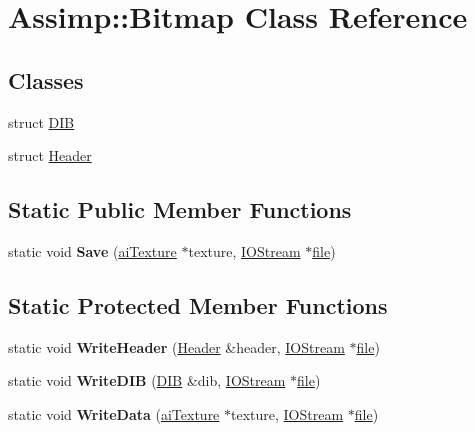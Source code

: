 \hypertarget{class_assimp_1_1_bitmap}{\section{Assimp\+:\+:Bitmap Class Reference}
\label{class_assimp_1_1_bitmap}
}
\subsection*{Classes}
\begin{DoxyCompactItemize}
\item 
struct \hyperlink{struct_assimp_1_1_bitmap_1_1_d_i_b}{D\+I\+B}
\item 
struct \hyperlink{struct_assimp_1_1_bitmap_1_1_header}{Header}
\end{DoxyCompactItemize}
\subsection*{Static Public Member Functions}
\begin{DoxyCompactItemize}
\item 
\hypertarget{class_assimp_1_1_bitmap_a2af199ae48f3145205f67a896ef381f6}{static void {\bfseries Save} (\hyperlink{structai_texture}{ai\+Texture} $\ast$texture, \hyperlink{class_assimp_1_1_i_o_stream}{I\+O\+Stream} $\ast$\hyperlink{structfile}{file})}\label{class_assimp_1_1_bitmap_a2af199ae48f3145205f67a896ef381f6}

\end{DoxyCompactItemize}
\subsection*{Static Protected Member Functions}
\begin{DoxyCompactItemize}
\item 
\hypertarget{class_assimp_1_1_bitmap_a2b62d534af8f7d427818789e5ddbe7be}{static void {\bfseries Write\+Header} (\hyperlink{struct_assimp_1_1_bitmap_1_1_header}{Header} \&header, \hyperlink{class_assimp_1_1_i_o_stream}{I\+O\+Stream} $\ast$\hyperlink{structfile}{file})}\label{class_assimp_1_1_bitmap_a2b62d534af8f7d427818789e5ddbe7be}

\item 
\hypertarget{class_assimp_1_1_bitmap_a6a622a57cc22d71f3299f6be0b10189f}{static void {\bfseries Write\+D\+I\+B} (\hyperlink{struct_assimp_1_1_bitmap_1_1_d_i_b}{D\+I\+B} \&dib, \hyperlink{class_assimp_1_1_i_o_stream}{I\+O\+Stream} $\ast$\hyperlink{structfile}{file})}\label{class_assimp_1_1_bitmap_a6a622a57cc22d71f3299f6be0b10189f}

\item 
\hypertarget{class_assimp_1_1_bitmap_a203d9dd582e604cbf92a2d2b7cc2690c}{static void {\bfseries Write\+Data} (\hyperlink{structai_texture}{ai\+Texture} $\ast$texture, \hyperlink{class_assimp_1_1_i_o_stream}{I\+O\+Stream} $\ast$\hyperlink{structfile}{file})}\label{class_assimp_1_1_bitmap_a203d9dd582e604cbf92a2d2b7cc2690c}

\end{DoxyCompactItemize}
